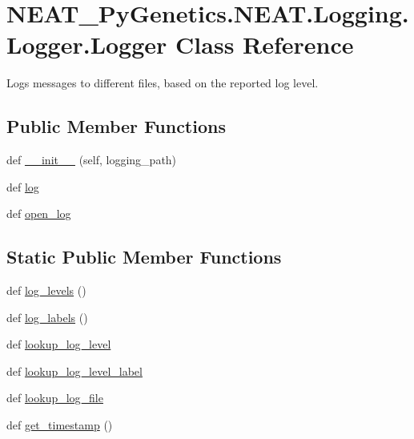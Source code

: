 \hypertarget{classNEAT__PyGenetics_1_1NEAT_1_1Logging_1_1Logger_1_1Logger}{}\section{N\+E\+A\+T\+\_\+\+Py\+Genetics.\+N\+E\+A\+T.\+Logging.\+Logger.\+Logger Class Reference}
\label{classNEAT__PyGenetics_1_1NEAT_1_1Logging_1_1Logger_1_1Logger}


Logs messages to different files, based on the reported log level.  


\subsection*{Public Member Functions}
\begin{DoxyCompactItemize}
\item 
def \hyperlink{classNEAT__PyGenetics_1_1NEAT_1_1Logging_1_1Logger_1_1Logger_a858ce7abb17975fcefb7f106aa4413fa}{\+\_\+\+\_\+init\+\_\+\+\_\+} (self, logging\+\_\+path)
\item 
def \hyperlink{classNEAT__PyGenetics_1_1NEAT_1_1Logging_1_1Logger_1_1Logger_acaf6c6a388e2aeceb191e6416431ef97}{log}
\item 
def \hyperlink{classNEAT__PyGenetics_1_1NEAT_1_1Logging_1_1Logger_1_1Logger_a4fd31c2e55ff5ec5710a96a86515f825}{open\+\_\+log}
\end{DoxyCompactItemize}
\subsection*{Static Public Member Functions}
\begin{DoxyCompactItemize}
\item 
def \hyperlink{classNEAT__PyGenetics_1_1NEAT_1_1Logging_1_1Logger_1_1Logger_abefae8d696e558dbcfe6d462ba412568}{log\+\_\+levels} ()
\item 
def \hyperlink{classNEAT__PyGenetics_1_1NEAT_1_1Logging_1_1Logger_1_1Logger_a1078ad3713a23a85878a39da7450f208}{log\+\_\+labels} ()
\item 
def \hyperlink{classNEAT__PyGenetics_1_1NEAT_1_1Logging_1_1Logger_1_1Logger_a6b33597baed0f2c1efdb4a1d92043512}{lookup\+\_\+log\+\_\+level}
\item 
def \hyperlink{classNEAT__PyGenetics_1_1NEAT_1_1Logging_1_1Logger_1_1Logger_aea6ef2ac230f8c205a06ee2f3ad026e3}{lookup\+\_\+log\+\_\+level\+\_\+label}
\item 
def \hyperlink{classNEAT__PyGenetics_1_1NEAT_1_1Logging_1_1Logger_1_1Logger_a6bdf29e33cd10e29df28e684ad55ac67}{lookup\+\_\+log\+\_\+file}
\item 
def \hyperlink{classNEAT__PyGenetics_1_1NEAT_1_1Logging_1_1Logger_1_1Logger_acb0c25d04b6f862dc358783264e29d66}{get\+\_\+timestamp} ()
\end{DoxyCompactItemize}


